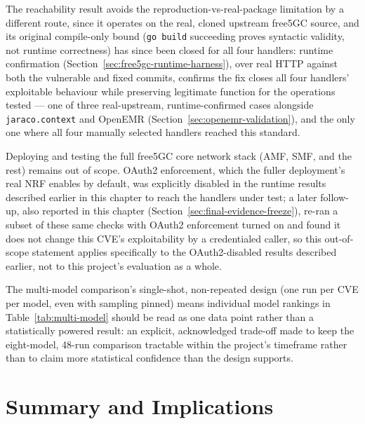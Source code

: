 \documentclass[12pt,a4paper]{report}
\begin{document}
The reachability result avoids the reproduction-vs-real-package limitation by a different route, since it operates on the real, cloned upstream free5GC source, and its original compile-only bound (\texttt{go build} succeeding proves syntactic validity, not runtime correctness) has since been closed for all four handlers: runtime confirmation (Section~\ref{sec:free5gc-runtime-harness}), over real HTTP against both the vulnerable and fixed commits, confirms the fix closes all four handlers' exploitable behaviour while preserving legitimate function for the operations tested — one of three real-upstream, runtime-confirmed cases alongside \texttt{jaraco.context} and OpenEMR (Section~\ref{sec:openemr-validation}), and the only one where all four manually selected handlers reached this standard.

Deploying and testing the full free5GC core network stack (AMF, SMF, and the rest) remains out of scope. OAuth2 enforcement, which the fuller deployment's real NRF enables by default, was explicitly disabled in the runtime results described earlier in this chapter to reach the handlers under test; a later follow-up, also reported in this chapter (Section~\ref{sec:final-evidence-freeze}), re-ran a subset of these same checks with OAuth2 enforcement turned on and found it does not change this CVE's exploitability by a credentialed caller, so this out-of-scope statement applies specifically to the OAuth2-disabled results described earlier, not to this project's evaluation as a whole.

The multi-model comparison's single-shot, non-repeated design (one run per CVE per model, even with sampling pinned) means individual model rankings in Table~\ref{tab:multi-model} should be read as one data point rather than a statistically powered result: an explicit, acknowledged trade-off made to keep the eight-model, 48-run comparison tractable within the project's timeframe rather than to claim more statistical confidence than the design supports.

\section{Summary and Implications}
\end{document}
